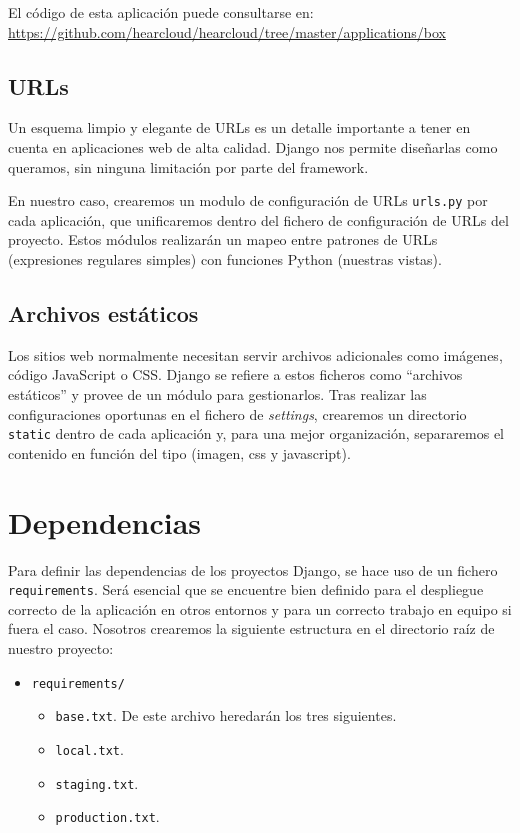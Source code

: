 El código de esta aplicación puede consultarse en: \url{https://github.com/hearcloud/hearcloud/tree/master/applications/box}

\subsection{URLs}

Un esquema limpio y elegante de URLs es un detalle importante a tener en cuenta en aplicaciones web de alta calidad. Django nos permite diseñarlas como queramos, sin ninguna limitación por parte del framework. 

En nuestro caso, crearemos un modulo de configuración de URLs \texttt{urls.py} por cada aplicación, que unificaremos dentro del fichero de configuración de URLs del proyecto. Estos módulos realizarán un mapeo entre patrones de URLs (expresiones regulares simples) con funciones Python (nuestras vistas).

\subsection{Archivos estáticos}
Los sitios web normalmente necesitan servir archivos adicionales como imágenes, código JavaScript o CSS. Django se refiere a estos ficheros como ``archivos estáticos'' y provee de un módulo para gestionarlos. Tras realizar las configuraciones oportunas en el fichero de \textit{settings}, crearemos un directorio \texttt{static} dentro de cada aplicación y, para una mejor organización, separaremos el contenido en función del tipo (imagen, css y  javascript).

\section{Dependencias}

Para definir las dependencias de los proyectos Django, se hace uso de un fichero \texttt{requirements}. Será esencial que se encuentre bien definido para el despliegue correcto de la aplicación en otros entornos y para un correcto trabajo en equipo si fuera el caso. Nosotros crearemos la siguiente estructura en el directorio raíz de nuestro proyecto:

\begin{itemize}
	\item \texttt{requirements/}
	\begin{itemize}
		\item \texttt{base.txt}. De este archivo heredarán los tres siguientes.
		\item \texttt{local.txt}.
		\item \texttt{staging.txt}.
		\item \texttt{production.txt}.
	\end{itemize}
\end{itemize}

